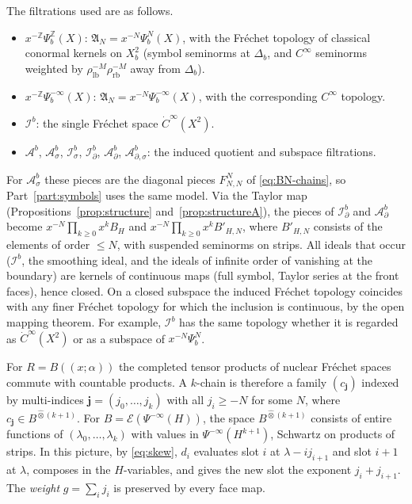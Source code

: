 \documentclass[11pt,oneside,reqno]{article}
\newcommand{\Z}{\mathbb Z}
\newcommand{\cE}{\mathcal E}
\newcommand{\Ib}{\mathcal I^b}
\newcommand{\Idb}{\mathcal I^b_\partial}
\newcommand{\Isb}{\mathcal I^b_\sigma}
\newcommand{\Ab}{\mathcal A^b}
\newcommand{\Asb}{\mathcal A^b_\sigma}
\newcommand{\Adb}{\mathcal A^b_\partial}
\newcommand{\Adsb}{\mathcal A^b_{\partial,\sigma}}
\theoremstyle{plain}
\theoremstyle{definition}
\theoremstyle{remark}
\newcommand{\Lser}[1]{(\!(#1)\!)}
\begin{document}
The filtrations used are as follows.
\begin{itemize}
\item \(x^{-\Z}\Psi_b^{\Z}(X)\): \(\mathfrak A_N=x^{-N}\Psi_b^N(X)\), with
the Fréchet topology of classical conormal kernels on \(X_b^2\) (symbol
seminorms at \(\Delta_b\), and \(C^\infty\) seminorms weighted by
\(\rho_{\mathrm{lb}}^{-M}\rho_{\mathrm{rb}}^{-M}\) away from \(\Delta_b\)).
\item \(x^{-\Z}\Psi_b^{-\infty}(X)\): \(\mathfrak A_N=x^{-N}
\Psi_b^{-\infty}(X)\), with the corresponding \(C^\infty\) topology.
\item \(\Ib\): the single Fréchet space \(\dot C^\infty(X^2)\).
\item \(\Ab\), \(\Asb\), \(\Isb\), \(\Idb\), \(\Adb\), \(\Adsb\): the
induced quotient and subspace filtrations.
\end{itemize}
For \(\Asb\) these pieces are the diagonal pieces \(F^N_{N,N}\) of
\eqref{eq:BN-chains}, so Part~\ref{part:symbols} uses the same model. Via
the Taylor map (Propositions~\ref{prop:structure}
and~\ref{prop:structureA}), the pieces of \(\Idb\) and \(\Adb\) become
\(x^{-N}\prod_{k\geq0}x^kB_H\) and \(x^{-N}\prod_{k\geq0}x^kB'_{H,N}\), where
\(B'_{H,N}\) consists of the elements of order \(\leq N\), with suspended
seminorms on strips. All ideals that occur (\(\Ib\), the smoothing ideal,
and the ideals of infinite order of vanishing at the boundary) are kernels
of continuous maps (full symbol, Taylor series at the front faces), hence
closed. On a closed subspace the induced Fréchet topology coincides with
any finer Fréchet topology for which the inclusion is continuous, by the
open mapping theorem. For example, \(\Ib\) has the same topology whether it is regarded
as \(\dot C^\infty(X^2)\) or as a subspace of \(x^{-N}\Psi_b^N\).

For \(R=B\Lser{x;\alpha}\) the completed tensor products of nuclear Fréchet
spaces commute with countable products. A \(k\)-chain is therefore a family
\((c_{\mathbf j})\) indexed by multi-indices \(\mathbf j=(j_0,\dots,j_k)\)
with all \(j_i\geq-N\) for some \(N\), where \(c_{\mathbf j}\in
B^{\widehat\otimes(k+1)}\). For \(B=\cE(\Psi^{-\infty}(H))\), the space
\(B^{\widehat\otimes(k+1)}\) consists of entire functions of
\((\lambda_0,\dots,\lambda_k)\) with values in \(\Psi^{-\infty}(H^{k+1})\),
Schwartz on products of strips. In this picture, by \eqref{eq:skew},
\(d_i\) evaluates slot \(i\) at \(\lambda-ij_{i+1}\) and slot \(i+1\) at
\(\lambda\), composes in the \(H\)-variables, and gives the new slot the
exponent \(j_i+j_{i+1}\). The \emph{weight} \(g=\sum_ij_i\) is preserved by
every face map.
\end{document}
